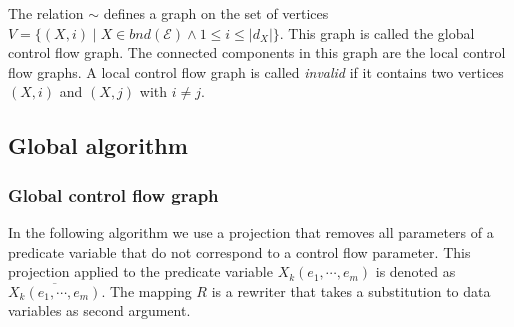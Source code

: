 The relation $\sim $ defines a graph on the set of vertices $V=\{(X,i)\mid
X\in bnd(\mathcal{E})\wedge 1\leq i\leq \left\vert d_{X}\right\vert \}$.
This graph is called the global control flow graph. The connected components
in this graph are the local control flow graphs. A local control flow graph
is called \emph{invalid} if it contains two vertices $(X,i)$ and $(X,j)$
with $i\neq j$. \newpage

\subsection{Global algorithm}

\subsubsection{Global control flow graph}

In the following algorithm we use a projection that removes all parameters
of a predicate variable that do not correspond to a control flow parameter.
This projection applied to the predicate variable $X_{k}(e_{1},\cdots
,e_{m}) $ is denoted as $\overline{X_{k}(e_{1},\cdots ,e_{m})}$. The mapping 
$R$ is a rewriter that takes a substitution to data variables as second
argument.

